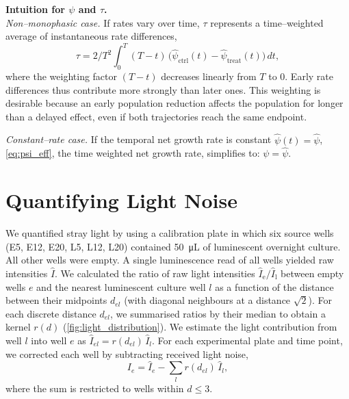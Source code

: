\begin{mdframed}[linewidth=0.8pt,backgroundcolor=gray!5,roundcorner=3pt]
  \small
  \textbf{Intuition for \(\psi\) and \(\tau\).}\\
  \emph{Non–monophasic case.}
  If rates vary over time, \(\tau\) represents a time–weighted average of instantaneous rate differences,
  \[
    \tau = 2/T^2 \int_{0}^{T}\!(T-t)\,\big(\hat{\psi}_{\mathrm{ctrl}}(t)-\hat{\psi}_{\mathrm{treat}}(t)\big)\,dt,
  \]
  where the weighting factor \((T-t)\) decreases linearly from \(T\) to \(0\).
  Early rate differences thus contribute more strongly than later ones.
  This weighting is desirable because an early population reduction affects the population for longer than a delayed effect, even if both trajectories reach the same endpoint.

  \emph{Constant–rate case.}
  If the temporal net growth rate  is constant $\hat{\psi}(t) = \hat{\psi}$, \autoref{eq:psi_eff}, the time weighted net growth rate, simplifies to:
  $\psi = \hat{\psi}$.
\end{mdframed}

\pagebreak
\section{Quantifying Light Noise}\label{ssec:lightnoise}
We quantified stray light by using a calibration plate in which six source wells (E5, E12, E20, L5, L12, L20) contained \SI{50}{\micro\liter} of luminescent overnight culture. All other wells were empty.
A single luminescence read of all wells yielded raw intensities $\hat I$.
We calculated the ratio of raw light intensities $\hat{I}_{\mathrm{e}}/\hat{I}_{\mathrm{l}}$ between empty wells $e$ and the nearest luminescent culture well $l$ as a function of the distance between their midpoints $d_{el}$ (with diagonal neighbours at a distance $\sqrt{2}$).
For each discrete distance $d_{el}$, we summarised ratios by their median to obtain a kernel $r(d)$ (\autoref{fig:light_distribution}).
We estimate the light contribution from well $l$ into well $e$ as $\hat I_{el}=r(d_{el})\,\hat I_l$.
For each experimental plate and time point, we corrected each well by subtracting received light noise,
\begin{equation}
  I_e=\hat I_e-\sum_l r(d_{el})\,\hat I_l,
  \label{eq:noise_corr}
\end{equation}
where the sum is restricted to wells within $d\le 3$.

